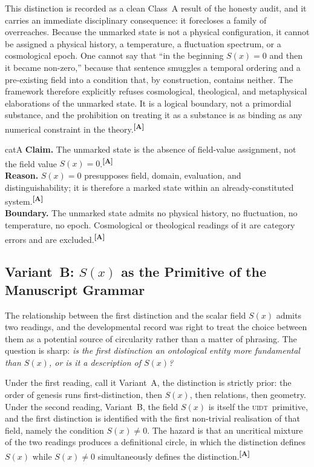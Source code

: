 \documentclass[12pt,a4paper,twoside]{article}
\theoremstyle{plain}
\theoremstyle{definition}
\theoremstyle{remark}
\newcommand{\UIDT}{\textsc{uidt}}
\newcommand{\catmark}[1]{\textsuperscript{\textsf{\textbf{[#1]}}}}
\begin{document}
This distinction is recorded as a clean Class~A result of the honesty audit, and it carries an immediate disciplinary consequence: it forecloses a family of overreaches. Because the unmarked state is not a physical configuration, it cannot be assigned a physical history, a temperature, a fluctuation spectrum, or a cosmological epoch. One cannot say that ``in the beginning $S(x)=0$ and then it became non-zero,'' because that sentence smuggles a temporal ordering and a pre-existing field into a condition that, by construction, contains neither. The framework therefore explicitly refuses cosmological, theological, and metaphysical elaborations of the unmarked state. It is a logical boundary, not a primordial substance, and the prohibition on treating it as a substance is as binding as any numerical constraint in the theory.\catmark{A}

\begin{evidencebox}{catA}
\textbf{Claim.} The unmarked state is the absence of field-value assignment, not
the field value $S(x)=0$.\catmark{A}\\[0.3em]
\textbf{Reason.} $S(x)=0$ presupposes field, domain, evaluation, and distinguishability; it is therefore a marked state within an already-constituted
system.\catmark{A}\\[0.3em]
\textbf{Boundary.} The unmarked state admits no physical history, no fluctuation, no temperature, no epoch. Cosmological or theological readings of it are category errors and are excluded.\catmark{A}
\end{evidencebox}

\subsection{Variant~B: \texorpdfstring{$S(x)$}{S(x)} as the Primitive of the Manuscript Grammar}
\label{subsec:variant-b}

The relationship between the first distinction and the scalar field $S(x)$ admits two readings, and the developmental record was right to treat the choice between them as a potential source of circularity rather than a matter of phrasing. The question is sharp: \emph{is the first distinction an ontological entity more fundamental than $S(x)$, or is it a description of $S(x)$?}

Under the first reading, call it Variant~A, the distinction is strictly prior: the order of genesis runs first-distinction, then $S(x)$, then relations, then geometry. Under the second reading, Variant~B, the field $S(x)$ is itself the \UIDT\ primitive, and the first distinction is identified with the first non-trivial realisation of that field, namely the condition $S(x)\neq 0$. The hazard is that an uncritical mixture of the two readings produces a definitional circle, in which the distinction defines $S(x)$ while $S(x)\neq 0$ simultaneously defines the distinction.\catmark{A}
\end{document}
